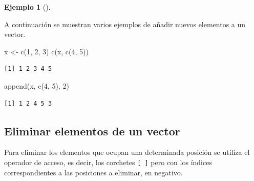 \documentclass[
  a4paper,
]{scrreport}
\newenvironment{Shaded}{\begin{snugshade}}{\end{snugshade}}
\newcommand{\DecValTok}[1]{\textcolor[rgb]{0.68,0.00,0.00}{#1}}
\newcommand{\FunctionTok}[1]{\textcolor[rgb]{0.28,0.35,0.67}{#1}}
\newcommand{\NormalTok}[1]{\textcolor[rgb]{0.00,0.23,0.31}{#1}}
\newcommand{\OtherTok}[1]{\textcolor[rgb]{0.00,0.23,0.31}{#1}}
\theoremstyle{definition}
\newtheorem{example}{Ejemplo}[chapter]
\theoremstyle{definition}
\theoremstyle{remark}
\begin{document}
\leavevmode{}%
\begin{example}[]\label{exm-añadir-elementos-vector}

A continuación se muestran varios ejemplos de añadir nuevos elementos a
un vector.

\begin{Shaded}
\begin{Highlighting}[]
\NormalTok{x }\OtherTok{\textless{}{-}} \FunctionTok{c}\NormalTok{(}\DecValTok{1}\NormalTok{, }\DecValTok{2}\NormalTok{, }\DecValTok{3}\NormalTok{)}
\FunctionTok{c}\NormalTok{(x, }\FunctionTok{c}\NormalTok{(}\DecValTok{4}\NormalTok{, }\DecValTok{5}\NormalTok{))}
\end{Highlighting}
\end{Shaded}

\begin{verbatim}
[1] 1 2 3 4 5
\end{verbatim}

\begin{Shaded}
\begin{Highlighting}[]
\FunctionTok{append}\NormalTok{(x, }\FunctionTok{c}\NormalTok{(}\DecValTok{4}\NormalTok{, }\DecValTok{5}\NormalTok{), }\DecValTok{2}\NormalTok{)}
\end{Highlighting}
\end{Shaded}

\begin{verbatim}
[1] 1 2 4 5 3
\end{verbatim}

\end{example}

\hypertarget{eliminar-elementos-de-un-vector}{%
\subsection{Eliminar elementos de un
vector}\label{eliminar-elementos-de-un-vector}}

Para eliminar los elementos que ocupan una determinada posición se
utiliza el operador de acceso, es decir, los corchetes \texttt{{[}\ {]}}
pero con los índices correspondientes a las posiciones a eliminar, en
negativo.
\end{document}
